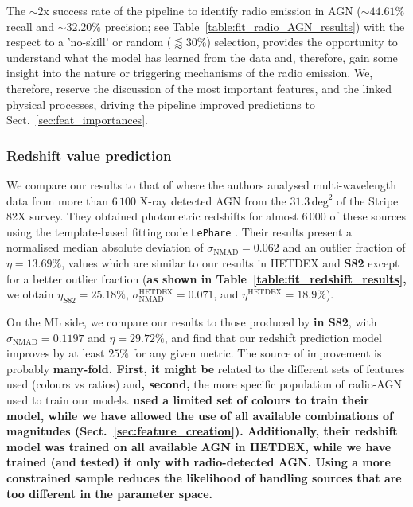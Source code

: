 \documentclass{aa}
\begin{document}
The ${\sim} 2$x success rate of the pipeline to identify radio emission in AGN (${\sim} 44.61\%$ recall and ${\sim} 32.20\%$ precision; see Table~\ref{table:fit_radio_AGN_results}) with the respect to a 'no-skill' or random (${\lessapprox}30 \%$) selection, provides the opportunity to understand what the model has learned from the data and, therefore, gain some insight into the nature or triggering mechanisms of the radio emission. We, therefore, reserve the discussion of the most important features, and the linked physical processes, driving the pipeline improved predictions to Sect.~\ref{sec:feat_importances}.


\subsubsection{Redshift value prediction}\label{sec:previous_z_values}

We compare our results to that of \citet[][Stripe 82X]{2017ApJ...850...66A} where the authors analysed multi-wavelength data from more than $6\,100$ X-ray detected AGN from the $31.3\, \mathrm{deg}^{2}$ of the Stripe 82X survey. They obtained photometric redshifts for almost $6\,000$ of these sources using the template-based fitting code \verb|LePhare| \citep{1999MNRAS.310..540A, 2006A&A...457..841I}. Their results present a normalised median absolute deviation of $\sigma_{\mathrm{NMAD}} {=} 0.062$ and an outlier fraction of $\eta {=} 13.69 \%$, values which are similar to our results in HETDEX and \textbf{S82} except for a better outlier fraction (\textbf{as shown in Table~\ref{table:fit_redshift_results},} we obtain $\eta_{S82}=25.18\%$, $\sigma_{\mathrm{NMAD}}^{\mathrm{HETDEX}} {=} 0.071$, and $\eta^{\mathrm{HETDEX}} {=} 18.9$\%).

On the ML side, we compare our results to those produced by \citet{2021Galax...9...86C} \textbf{in S82}, with $\sigma_{\mathrm{NMAD}} = 0.1197$ and $\eta = 29.72 \%$, and find that our redshift prediction model improves by at least $25 \%$ for any given metric.
The source of improvement is probably \textbf{many-fold. First, it might be} related to the different sets of features used (colours vs ratios) and\textbf{, second,} the more specific population of radio-AGN used to train our models. \textbf{\citet{2021Galax...9...86C} used a limited set of colours to train their model, while we have allowed the use of all available combinations of magnitudes (Sect.~\ref{sec:feature_creation}). Additionally, their redshift model was trained on all available AGN in HETDEX, while we have trained (and tested) it only with radio-detected AGN. Using a more constrained sample reduces the likelihood of handling sources that are too different in the parameter space.}
\end{document}
